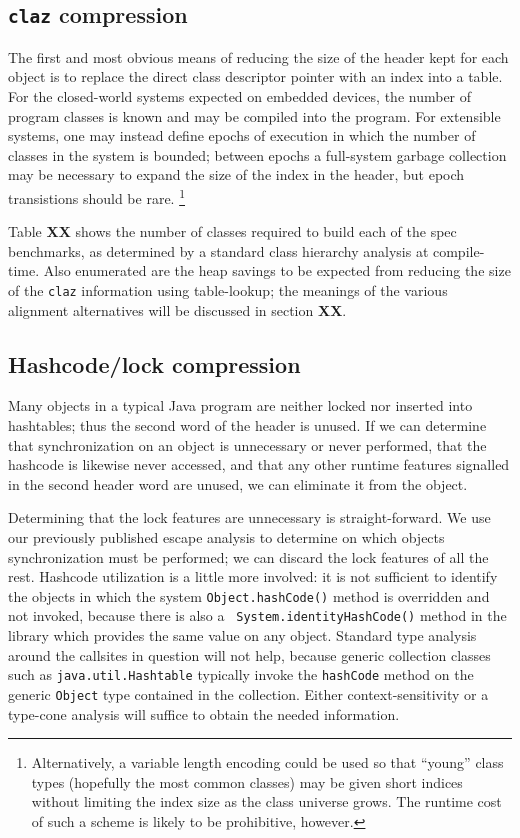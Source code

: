 \documentclass[preprint]{acmconf}
\begin{document}
\subsection{{\tt claz} compression}
The first and most obvious means of reducing the size of the header
kept for each object is to replace the direct class descriptor
pointer with an index into a table.  For the closed-world systems
expected on embedded devices, the number of program classes is known
and may be compiled into the program.  For extensible systems, one may
instead define epochs of execution in which the number of classes
in the system is bounded; between epochs a full-system garbage
collection may be necessary to expand the size of the index in the
header, but epoch transistions should be rare.%
\footnote{Alternatively, a
variable length encoding could be used so that ``young'' class types
(hopefully the most common classes) may be given short indices without
limiting the index size as the class universe grows.  The runtime cost
of such a scheme is likely to be prohibitive, however.}

Table {\bf XX} shows the number of classes required to build each of
the spec benchmarks, as determined by a standard class hierarchy
analysis at compile-time.  Also enumerated are the heap savings to be
expected from reducing the size of the {\tt claz} information using
table-lookup; the meanings of the various alignment alternatives will
be discussed in section {\bf XX}.

\subsection{Hashcode/lock compression}
Many objects in a typical Java program are neither locked nor inserted
into hashtables; thus the second word of the header is unused.
If we can determine that synchronization on an object is unnecessary
or never performed, that the hashcode is likewise never accessed,
and that any other runtime features signalled in the second header
word are unused, we can eliminate it from the object.

Determining that the lock features are unnecessary is straight-forward.
We use our previously published escape analysis \cite{whaley99,vivien01}
to determine on which objects synchronization must be performed; we
can discard the lock features of all the rest.  Hashcode utilization
is a little more involved: it is not sufficient to identify the
objects in which the system {\tt Object.hashCode()} method is
overridden and not invoked, because there is also a {\tt
  System.identityHashCode()} method in the library which provides the
same value on any object.  Standard type analysis around the
callsites in question will not help, because generic collection
classes such as {\tt java.util.Hashtable} typically invoke
the {\tt hashCode} method on the generic {\tt Object} type contained
in the collection.  Either context-sensitivity or a type-cone analysis
will suffice to obtain the needed information.
\end{document}

